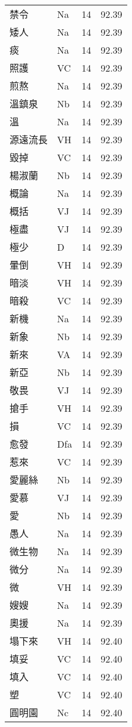 \documentclass[twocolumn]{book}
\begin{document}
\begin{supertabular}{llrr}
禁令 & Na & 14 &  92.39\\
矮人 & Na & 14 &  92.39\\
痰 & Na & 14 &  92.39\\
照護 & VC & 14 &  92.39\\
煎熬 & Na & 14 &  92.39\\
溫鎮泉 & Nb & 14 &  92.39\\
溫 & Na & 14 &  92.39\\
源遠流長 & VH & 14 &  92.39\\
毀掉 & VC & 14 &  92.39\\
楊淑蘭 & Nb & 14 &  92.39\\
概論 & Na & 14 &  92.39\\
概括 & VJ & 14 &  92.39\\
極盡 & VJ & 14 &  92.39\\
極少 & D & 14 &  92.39\\
暈倒 & VH & 14 &  92.39\\
暗淡 & VH & 14 &  92.39\\
暗殺 & VC & 14 &  92.39\\
新機 & Na & 14 &  92.39\\
新象 & Nb & 14 &  92.39\\
新來 & VA & 14 &  92.39\\
新亞 & Nb & 14 &  92.39\\
敬畏 & VJ & 14 &  92.39\\
搶手 & VH & 14 &  92.39\\
損 & VC & 14 &  92.39\\
愈發 & Dfa & 14 &  92.39\\
惹來 & VC & 14 &  92.39\\
愛麗絲 & Nb & 14 &  92.39\\
愛慕 & VJ & 14 &  92.39\\
愛 & Nb & 14 &  92.39\\
愚人 & Na & 14 &  92.39\\
微生物 & Na & 14 &  92.39\\
微分 & Na & 14 &  92.39\\
微 & VH & 14 &  92.39\\
嫂嫂 & Na & 14 &  92.39\\
奧援 & Na & 14 &  92.39\\
塌下來 & VH & 14 &  92.40\\
填妥 & VC & 14 &  92.40\\
填入 & VC & 14 &  92.40\\
塑 & VC & 14 &  92.40\\
圓明園 & Nc & 14 &  92.40\\

\end{supertabular}
\end{document}
